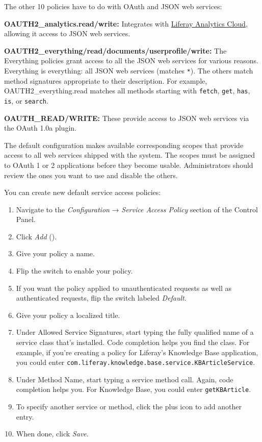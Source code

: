 The other 10 policies have to do with OAuth and JSON web services:

\textbf{OAUTH2\_analytics.read/write:} Integrates with
\href{https://www.liferay.com/products/analytics-cloud}{Liferay
Analytics Cloud}, allowing it access to JSON web services.

\textbf{OAUTH2\_everything/read/documents/userprofile/write:} The
Everything policies grant access to all the JSON web services for
various reasons. Everything is everything: all JSON web services
(matches \texttt{*}). The others match method signatures appropriate to
their description. For example, OAUTH2\_everything.read matches all
methods starting with \texttt{fetch}, \texttt{get}, \texttt{has},
\texttt{is}, or \texttt{search}.

\textbf{OAUTH\_READ/WRITE:} These provide access to JSON web services
via the OAuth 1.0a plugin.

The default configuration makes available corresponding scopes that
provide access to all web services shipped with the system. The scopes
must be assigned to OAuth 1 or 2 applications before they become usable.
Administrators should review the ones you want to use and disable the
others.

You can create new default service access policies:

\begin{enumerate}
\def\labelenumi{\arabic{enumi}.}
\item
  Navigate to the \emph{Configuration} → \emph{Service Access Policy}
  section of the Control Panel.
\item
  Click \emph{Add}
  ().
\item
  Give your policy a name.
\item
  Flip the switch to enable your policy.
\item
  If you want the policy applied to unauthenticated requests as well as
  authenticated requests, flip the switch labeled \emph{Default}.
\item
  Give your policy a localized title.
\item
  Under Allowed Service Signatures, start typing the fully qualified
  name of a service class that's installed. Code completion helps you
  find the class. For example, if you're creating a policy for Liferay's
  Knowledge Base application, you could enter
  \texttt{com.liferay.knowledge.base.service.KBArticleService}.
\item
  Under Method Name, start typing a service method call. Again, code
  completion helps you. For Knowledge Base, you could enter
  \texttt{getKBArticle}.
\item
  To specify another service or method, click the plus icon to add
  another entry.
\item
  When done, click \emph{Save}.
\end{enumerate}

